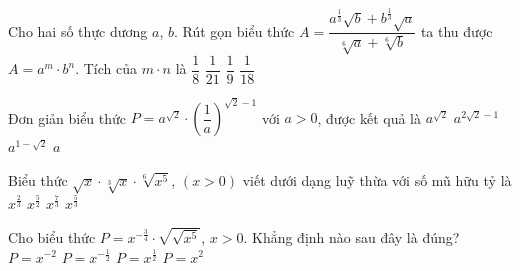 \begin{ex}%
	Cho hai số thực dương $a$, $b$. Rút gọn biểu thức  $A=\dfrac{a^{\tfrac{1}{3}}\sqrt{b}+b^{\tfrac{1}{3}}\sqrt{a}}{\sqrt[6]a+\sqrt[6]b}$ ta thu được $A=a^m\cdot b^n$. Tích của $m\cdot n$ là
	\choice 
		{$\dfrac{1}{8}$} 
		 {$\dfrac{1}{21}$}
		 {\True $\dfrac{1}{9}$}
		{$\dfrac{1}{18}$} 
\end{ex}

\begin{ex}%
	 Đơn giản biểu thức $P=a^{\sqrt{2}}\cdot \left(\dfrac{1}{a}\right)^{\sqrt{2}-1}$ với $a>0$, được kết quả là
	\choice 
		{$a^{\sqrt{2}}$} 
		{$a^{2\sqrt{2}-1}$} 
		{$a^{1-\sqrt{2}}$} 
		{\True  $a$}
\end{ex}

\begin{ex}%
	Biểu thức $\sqrt{x}\cdot \sqrt[3]{x}\cdot \sqrt[6]{x^5}$, $(x>0)$ viết dưới dạng luỹ thừa với số mũ  hữu tỷ là
	\choice 
		{$x^{\tfrac{2}{3}}$} 
		 {$x^{\tfrac{5}{2}}$}
		 {$x^{\tfrac{7}{3}}$}
		{\True $x^{\tfrac{5}{3}}$} 
\end{ex}

\begin{ex}%
	Cho biểu thức $P=x^{-\tfrac{3}{4}}\cdot \sqrt{\sqrt{x^5}}$,  $x>0$. Khẳng định nào sau đây là đúng?
	\choice 
		{$P=x^{-2}$} 
		{$P=x^{-\tfrac{1}{2}}$} 
		{\True  $P=x^{\tfrac{1}{2}}$}
		{$P=x^2$} 
\end{ex}

